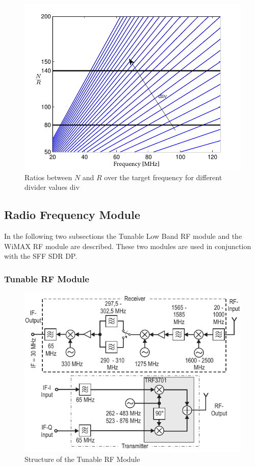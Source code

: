 \begin{figure}
	\centering
		\includegraphics[width = 1.0\textwidth]{../kapitel03/figures/f_out_pll.pdf}
	\caption{Ratios between $N$ and $R$ over the target frequency for different divider values div}
	\label{fig:f_out_pll}
\end{figure}

 
\subsection{Radio Frequency Module}
\label{subsec:RFM}
In the following two subsections the Tunable Low Band RF module and the WiMAX RF module are described. These two modules are used in conjunction with the \ac{SFF SDR DP}.

\subsubsection{Tunable RF Module}

\begin{figure}
	\centering
		\includegraphics[width=1.00\textwidth]{../kapitel03/figures/Tunable_RF_Module.pdf}
	\caption{Structure of the Tunable RF Module}
	\label{fig:Tunable_RF_Module}
\end{figure}

